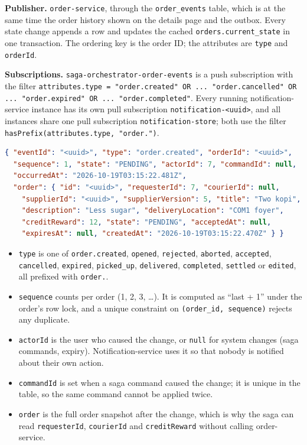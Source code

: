 \documentclass[11pt,a4paper]{article}
\newcommand{\code}[1]{\nolinkurl{#1}}
\begin{document}
\textbf{Publisher.} \code{order-service}, through the \code{order_events} table, which is
at the same time the order history shown on the details page and the outbox. Every state
change appends a row and updates the cached \code{orders.current_state} in one
transaction. The ordering key is the order ID; the attributes are \code{type} and
\code{orderId}.

\textbf{Subscriptions.} \code{saga-orchestrator-order-events} is a push subscription
with the filter \code{attributes.type = "order.created" OR ... "order.cancelled" OR
... "order.expired" OR ... "order.completed"}. Every running notification-service
instance has its own pull subscription \code{notification-<uuid>}, and all instances
share one pull subscription \code{notification-store}; both use the filter
\code{hasPrefix(attributes.type, "order.")}.

\par\noindent\begin{minipage}{\linewidth}
\begin{lstlisting}[language=json]
{ "eventId": "<uuid>", "type": "order.created", "orderId": "<uuid>",
  "sequence": 1, "state": "PENDING", "actorId": 7, "commandId": null,
  "occurredAt": "2026-10-19T03:15:22.481Z",
  "order": { "id": "<uuid>", "requesterId": 7, "courierId": null,
    "supplierId": "<uuid>", "supplierVersion": 5, "title": "Two kopi",
    "description": "Less sugar", "deliveryLocation": "COM1 foyer",
    "creditReward": 12, "state": "PENDING", "acceptedAt": null,
    "expiresAt": null, "createdAt": "2026-10-19T03:15:22.470Z" } }
\end{lstlisting}
\end{minipage}\par

\begin{itemize}
  \item \code{type} is one of \code{order.created}, \code{opened}, \code{rejected},
  \code{aborted}, \code{accepted}, \code{cancelled}, \code{expired}, \code{picked_up},
  \code{delivered}, \code{completed}, \code{settled} or \code{edited}, all prefixed with
  \code{order.}.
  \item \code{sequence} counts per order (1, 2, 3, \ldots). It is computed as ``last + 1''
  under the order's row lock, and a unique constraint on \code{(order_id, sequence)}
  rejects any duplicate.
  \item \code{actorId} is the user who caused the change, or \code{null} for system
  changes (saga commands, expiry). Notification-service uses it so that nobody is
  notified about their own action.
  \item \code{commandId} is set when a saga command caused the change; it is unique in
  the table, so the same command cannot be applied twice.
  \item \code{order} is the full order snapshot after the change, which is why the saga
  can read \code{requesterId}, \code{courierId} and \code{creditReward} without calling
  order-service.
\end{itemize}
\end{document}
